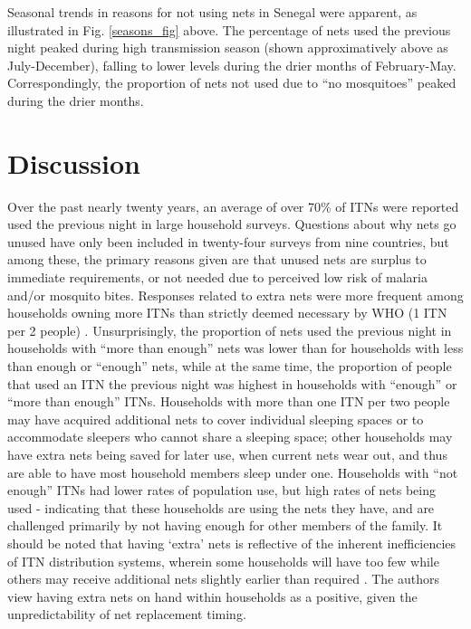 \documentclass[review,
3p]{elsarticle} %
\begin{document}
Seasonal trends in reasons for not using nets in Senegal were apparent,
as illustrated in Fig. \ref{seasons_fig} above. The percentage of nets
used the previous night peaked during high transmission season (shown
approximatively above as July-December), falling to lower levels during
the drier months of February-May. Correspondingly, the proportion of
nets not used due to ``no mosquitoes'' peaked during the drier months.

\hypertarget{discussion}{%
\section{Discussion}\label{discussion}}

Over the past nearly twenty years, an average of over 70\% of ITNs were
reported used the previous night in large household surveys. Questions
about why nets go unused have only been included in twenty-four surveys
from nine countries, but among these, the primary reasons given are that
unused nets are surplus to immediate requirements, or not needed due to
perceived low risk of malaria and/or mosquito bites. Responses related
to extra nets were more frequent among households owning more ITNs than
strictly deemed necessary by WHO (1 ITN per 2 people)
\citep{WorldHealthOrganization:2019ws}. Unsurprisingly, the proportion
of nets used the previous night in households with ``more than enough''
nets was lower than for households with less than enough or ``enough''
nets, while at the same time, the proportion of people that used an ITN
the previous night was highest in households with ``enough'' or ``more
than enough'' ITNs. Households with more than one ITN per two people may
have acquired additional nets to cover individual sleeping spaces or to
accommodate sleepers who cannot share a sleeping space; other households
may have extra nets being saved for later use, when current nets wear
out, and thus are able to have most household members sleep under one.
Households with ``not enough'' ITNs had lower rates of population use,
but high rates of nets being used - indicating that these households are
using the nets they have, and are challenged primarily by not having
enough for other members of the family. It should be noted that having
`extra' nets is reflective of the inherent inefficiencies of ITN
distribution systems, wherein some households will have too few while
others may receive additional nets slightly earlier than required
\citep{Bhatt:2015gn}. The authors view having extra nets on hand within
households as a positive, given the unpredictability of net replacement
timing.
\end{document}

